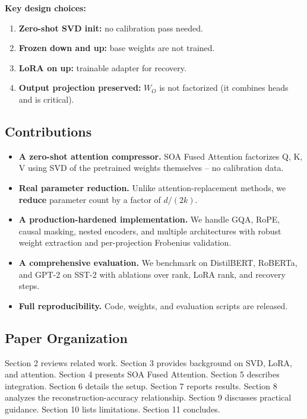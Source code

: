 \textbf{Key design choices:}

\begin{enumerate}
\item \textbf{Zero-shot SVD init:} no calibration pass needed.
\item \textbf{Frozen down and up:} base weights are not trained.
\item \textbf{LoRA on up:} trainable adapter for recovery.
\item \textbf{Output projection preserved:} $W_O$ is not factorized (it combines
  heads and is critical).

\end{enumerate}
\subsection{Contributions}

\begin{itemize}
\item \textbf{A zero-shot attention compressor.} SOA Fused Attention factorizes Q, K,
  V using SVD of the pretrained weights themselves -- no calibration data.
\item \textbf{Real parameter reduction.} Unlike attention-replacement methods, we
  \textbf{reduce} parameter count by a factor of $d / (2k)$.
\item \textbf{A production-hardened implementation.} We handle GQA, RoPE, causal
  masking, nested encoders, and multiple architectures with robust weight
  extraction and per-projection Frobenius validation.
\item \textbf{A comprehensive evaluation.} We benchmark on DistilBERT, RoBERTa, and
  GPT-2 on SST-2 with ablations over rank, LoRA rank, and recovery steps.
\item \textbf{Full reproducibility.} Code, weights, and evaluation scripts are released.

\end{itemize}
\subsection{Paper Organization}

Section 2 reviews related work. Section 3 provides background on SVD, LoRA, 
and attention. Section 4 presents SOA Fused Attention. Section 5 describes 
integration. Section 6 details the setup. Section 7 reports results. 
Section 8 analyzes the reconstruction-accuracy relationship. Section 9 
discusses practical guidance. Section 10 lists limitations. Section 11 
concludes.



